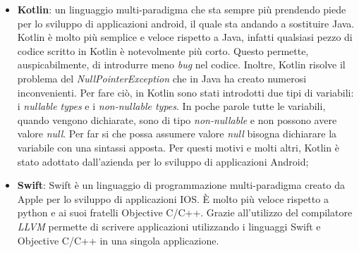 \begin{itemize}
  \item \textbf{Kotlin}: un linguaggio multi-paradigma che sta sempre più prendendo piede per lo sviluppo di applicazioni android, il quale sta andando a sostituire Java. Kotlin è molto più semplice e veloce rispetto a Java, infatti qualsiasi pezzo di codice scritto in Kotlin è notevolmente più corto. Questo permette, auspicabilmente, di introdurre meno \textit{bug} nel codice. Inoltre, Kotlin risolve il problema del \textit{NullPointerException} che in Java ha creato numerosi inconvenienti. Per fare ciò, in Kotlin sono stati introdotti due tipi di variabili: i \textit{nullable types} e i \textit{non-nullable types}. In poche parole tutte le variabili, quando vengono dichiarate, sono di tipo \textit{non-nullable} e non possono avere valore \textit{null}. Per far si che possa assumere valore \textit{null} bisogna dichiarare la variabile con una sintassi apposta. Per questi motivi e molti altri, Kotlin è stato adottato dall'azienda per lo sviluppo di applicazioni Android;

  \item \textbf{Swift}: Swift è un linguaggio di programmazione multi-paradigma creato da Apple per lo sviluppo di applicazioni IOS. È molto più veloce rispetto a python e ai suoi fratelli Objective C/C++. Grazie all'utilizzo del compilatore \textit{LLVM} permette di scrivere applicazioni utilizzando i linguaggi Swift e Objective C/C++ in una singola applicazione.
\end{itemize}

